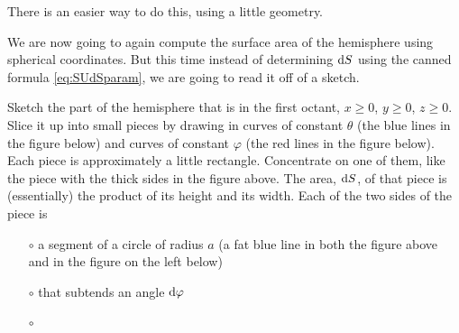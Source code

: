 There is an easier way to do this, using a little geometry.
\begin{eg}
       \label{eg:SphereAreaSCB}
We are now going to again compute the surface area of the hemisphere
using spherical coordinates.  
But this time instead of determining $\mathrm{d}S$ using the canned formula
\eqref{eq:SUdSparam}, we are going to read it off of a sketch.

Sketch the part of the hemisphere that is in the first octant,
$x\ge 0$, $y\ge 0$, $z\ge 0$. Slice it up into small pieces by
drawing in curves of constant $\theta$ (the blue lines in the figure below)
and curves of constant $\varphi$ (the red lines in the figure below).
Each piece is approximately a little rectangle. Concentrate on one of them,
like the piece with the thick sides in the figure above. The area, $\mathrm{d}S$,
of that piece is (essentially) the product of its height and its width.
Each of the two sides of the piece is
\begin{itemize}\itemsep1pt \parskip0pt  %
\item[$\circ$]
a segment of a circle of radius $a$
(a fat blue line in both the figure above and in the figure on the left below) 
\item[$\circ$]
that subtends an angle $\mathrm{d}\varphi$
\item[$\circ$]

\end{itemize}
\end{eg}
